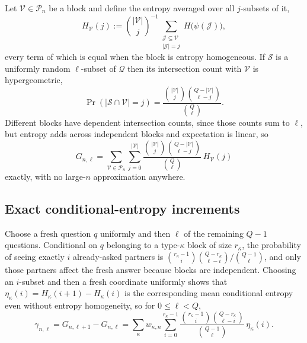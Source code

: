 Let $\mathcal V \in \mathcal P_n$ be a block and define the entropy
averaged over all $j$-subsets of it,
%
\begin{equation}
  H_{\mathcal V}(j)
  := \binom{|\mathcal V|}{j}^{-1}
  \sum_{\substack{\mathcal J\subseteq\mathcal V\\ |\mathcal J| = j}}
  H\big(\psi(\mathcal J)\big),
  \label{eq:appblockH}
\end{equation}
%
every term of which is equal when the block is entropy homogeneous.
If $\mathcal S$ is a uniformly random $\ell$-subset of $\mathcal Q$
then its intersection count with $\mathcal V$ is hypergeometric,
%
\begin{equation}
  \Pr(|\mathcal S\cap\mathcal V| = j)
  = \frac{\binom{|\mathcal V|}{j}\binom{Q-|\mathcal V|}{\ell-j}}
         {\binom{Q}{\ell}} .
  \label{eq:apphyper}
\end{equation}
%
Different blocks have dependent intersection counts, since those
counts sum to $\ell$, but entropy adds across independent blocks and
expectation is linear, so
%
\begin{equation}
  G_{n,\ell}
  = \sum_{\mathcal V\in\mathcal P_n}\sum_{j=0}^{|\mathcal V|}
  \frac{\binom{|\mathcal V|}{j}\binom{Q-|\mathcal V|}{\ell-j}}
       {\binom{Q}{\ell}}\,H_{\mathcal V}(j) 
  \label{eq:appGnl}
\end{equation}
%
exactly, with no large-$n$ approximation anywhere.

\subsection{Exact conditional-entropy increments}

Choose a fresh question $q$ uniformly and then $\ell$ of the
remaining $Q-1$ questions. Conditional on $q$ belonging to a
type-$\kappa$ block of size $r_\kappa$, the probability of seeing
exactly $i$ already-asked partners is
$\binom{r_\kappa-1}{i}\binom{Q-r_\kappa}{\ell-i}\big/
\binom{Q-1}{\ell}$, and only those partners affect the fresh answer
because blocks are independent. Choosing an $i$-subset and then a
fresh coordinate uniformly shows that
$\eta_\kappa(i) = H_\kappa(i+1)-H_\kappa(i)$ is the corresponding
mean conditional entropy even without entropy homogeneity, so for
$0\le\ell<Q$,
%
\begin{equation}
  \gamma_{n,\ell}
  = G_{n,\ell+1}-G_{n,\ell}
  = \sum_\kappa w_{\kappa,n}\sum_{i=0}^{r_\kappa-1}
  \frac{\binom{r_\kappa-1}{i}\binom{Q-r_\kappa}{\ell-i}}
       {\binom{Q-1}{\ell}}\,\eta_\kappa(i) . 
  \label{eq:appgamma}
\end{equation}

